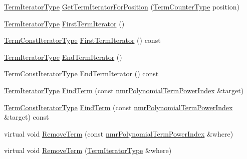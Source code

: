 \begin{DoxyCompactItemize}
\item 
\hyperlink{classnmr_polynomial_container_a276e57445d038e8a16462f47b85719a3}{Term\-Iterator\-Type} \hyperlink{classnmr_polynomial_container_aa67592164a3279435821dafeef6da287}{Get\-Term\-Iterator\-For\-Position} (\hyperlink{classnmr_polynomial_base_a4b0abd66b12b6f5bfb30d0eb1607e661}{Term\-Counter\-Type} position)
\item 
\hyperlink{classnmr_polynomial_container_a276e57445d038e8a16462f47b85719a3}{Term\-Iterator\-Type} \hyperlink{classnmr_polynomial_container_ae7f1d8d2a7a436d50f037eca26a2d071}{First\-Term\-Iterator} ()
\item 
\hyperlink{classnmr_polynomial_container_aba8d31506ab6a487fdc4fe2815469442}{Term\-Const\-Iterator\-Type} \hyperlink{classnmr_polynomial_container_a35d115a7a1de687fbd430fc3e72d1852}{First\-Term\-Iterator} () const 
\item 
\hyperlink{classnmr_polynomial_container_a276e57445d038e8a16462f47b85719a3}{Term\-Iterator\-Type} \hyperlink{classnmr_polynomial_container_a35de8fd324e8a82fafd8b1f142454f52}{End\-Term\-Iterator} ()
\item 
\hyperlink{classnmr_polynomial_container_aba8d31506ab6a487fdc4fe2815469442}{Term\-Const\-Iterator\-Type} \hyperlink{classnmr_polynomial_container_a6f91158da45a46d4e893d2f12fe66c0e}{End\-Term\-Iterator} () const 
\item 
\hyperlink{classnmr_polynomial_container_a276e57445d038e8a16462f47b85719a3}{Term\-Iterator\-Type} \hyperlink{classnmr_polynomial_container_a0e60c3316d2eb4bd648060f86277f965}{Find\-Term} (const \hyperlink{classnmr_polynomial_term_power_index}{nmr\-Polynomial\-Term\-Power\-Index} \&target)
\item 
\hyperlink{classnmr_polynomial_container_aba8d31506ab6a487fdc4fe2815469442}{Term\-Const\-Iterator\-Type} \hyperlink{classnmr_polynomial_container_a90f2dabc7119967f2eae12e5dc8df03d}{Find\-Term} (const \hyperlink{classnmr_polynomial_term_power_index}{nmr\-Polynomial\-Term\-Power\-Index} \&target) const 
\item 
virtual void \hyperlink{classnmr_polynomial_container_a550fbc8732a929a79236887f0fdddd4c}{Remove\-Term} (const \hyperlink{classnmr_polynomial_term_power_index}{nmr\-Polynomial\-Term\-Power\-Index} \&where)
\item 
virtual void \hyperlink{classnmr_polynomial_container_a9fc6e6c406c10d615d3cf5a97926720f}{Remove\-Term} (\hyperlink{classnmr_polynomial_container_a276e57445d038e8a16462f47b85719a3}{Term\-Iterator\-Type} \&where)
\item 

\end{DoxyCompactItemize}
